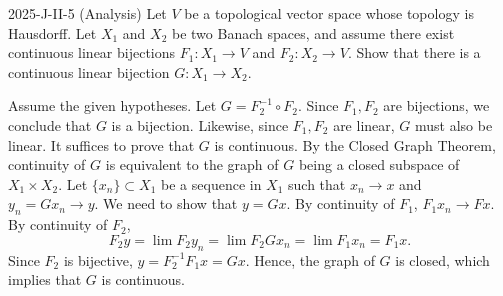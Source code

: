 \documentclass{article}
\begin{document}
\begin{prb}{2025-J-II-5 (Analysis)}
	Let $V$ be a topological vector space whose topology is Hausdorff. Let $X_{1}$ and $X_{2}$ be two Banach spaces, and assume there exist continuous linear bijections $F_{1}: X_{1} \to V$ and $F_{2}: X_{2} \to V$. Show that there is a continuous linear bijection $G: X_{1} \to X_{2}$. 
\end{prb}
\begin{solutions}
	Assume the given hypotheses. Let $G = F_{2}^{-1} \circ F_{2}$. Since $F_{1}, F_{2}$ are bijections, we conclude that $G$ is a bijection. Likewise, since $F_{1}, F_{2}$ are linear, $G$ must also be linear. It suffices to prove that $G$ is continuous. By the Closed Graph Theorem, continuity of $G$ is equivalent to the graph of $G$ being a closed subspace of $X_{1} \times X_{2}$. Let $\{x_{n}\} \subset X_{1}$ be a sequence in $X_{1}$ such that $x_{n} \to x$ and $y_{n} = Gx_{n} \to y$. We need to show that $y = Gx$. By continuity of $F_{1}$, $F_{1}x_{n} \to Fx$. By continuity of $F_{2}$, 
		\begin{equation}
			F_{2}y = \lim F_{2}y_{n} = \lim F_{2}Gx_{n} = \lim F_{1}x_{n} = F_{1}x. 
		\end{equation}
	Since $F_{2}$ is bijective, $y = F_{2}^{-1}F_{1}x = Gx$. Hence, the graph of $G$ is closed, which implies that $G$ is continuous. 
\end{solutions}
\end{document}
